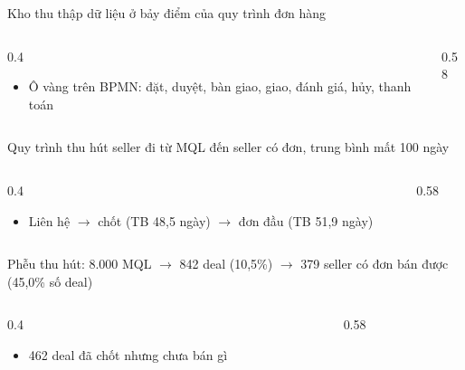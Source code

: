\begin{frame}{Kho thu thập dữ liệu ở bảy điểm của quy trình đơn hàng}
\begin{columns}[T]\begin{column}{0.4\textwidth}
\begin{itemize}
  \item Ô vàng trên BPMN: đặt, duyệt, bàn giao, giao, đánh giá, hủy, thanh toán
\end{itemize}
\end{column}\begin{column}{0.58\textwidth}
\begin{center}\end{center}
\end{column}\end{columns}

\end{frame}

\begin{frame}{Quy trình thu hút seller đi từ MQL đến seller có đơn, trung bình mất 100 ngày}
\begin{columns}[T]\begin{column}{0.4\textwidth}
\begin{itemize}
  \item Liên hệ $\rightarrow$ chốt (TB 48,5 ngày) $\rightarrow$ đơn đầu (TB 51,9 ngày)
\end{itemize}
\end{column}\begin{column}{0.58\textwidth}
\begin{center}\end{center}
\end{column}\end{columns}

\end{frame}

\begin{frame}{Phễu thu hút: 8.000 MQL $\rightarrow$ 842 deal (10,5\%) $\rightarrow$ 379 seller có đơn bán được (45,0\% số deal)}
\begin{columns}[T]\begin{column}{0.4\textwidth}
\begin{itemize}
  \item 462 deal đã chốt nhưng chưa bán gì
\end{itemize}
\end{column}\begin{column}{0.58\textwidth}
\begin{center}\end{center}
\end{column}\end{columns}

\end{frame}

